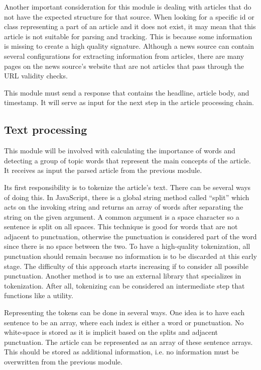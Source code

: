 \documentclass[11pt,titlepage]{report}
\begin{document}
Another important consideration for this module is dealing with articles that do not have the expected structure for that source. When looking for a specific id or class representing a part of an article and it does not exist, it may mean that this article is not suitable for parsing and tracking. This is because some information is missing to create a high quality signature. Although a news source can contain several configurations for extracting information from articles, there are many pages on the news source's website that are not articles that pass through the URL validity checks.

This module must send a response that contains the headline, article body, and timestamp. It will serve as input for the next step in the article processing chain.

\subsection{Text processing}
This module will be involved with calculating the importance of words and detecting a group of topic words that represent the main concepts of the article. It receives as input the parsed article from the previous module.

Its first responsibility is to tokenize the article's text. There can be several ways of doing this. In JavaScript, there is a global string method called ``split'' which acts on the invoking string and returns an array of words after separating the string on the given argument. A common argument is a space character so a sentence is split on all spaces. This technique is good for words that are not adjacent to punctuation, otherwise the punctuation is considered part of the word since there is no space between the two. To have a high-quality tokenization, all punctuation should remain because no information is to be discarded at this early stage. The difficulty of this approach starts increasing if to consider all possible punctuation. Another method is to use an external library that specializes in tokenization. After all, tokenizing can be considered an intermediate step that functions like a utility.

Representing the tokens can be done in several ways. One idea is to have each sentence to be an array, where each index is either a word or punctuation. No white-space is stored as it is implicit based on the splits and adjacent punctuation. The article can be represented as an array of these sentence arrays. This should be stored as additional information, i.e. no information must be overwritten from the previous module. 
\end{document}
